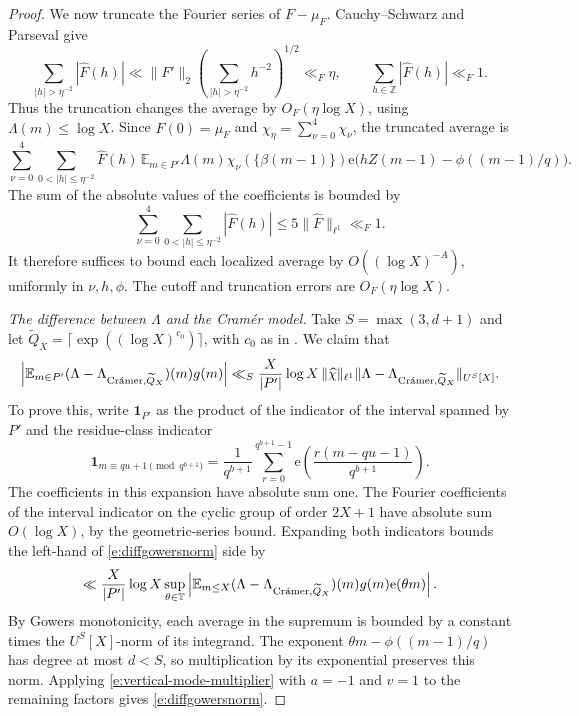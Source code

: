 \documentclass[12pt]{amsart}
\newcommand{\1}{\mathbf 1}
\newcommand{\e}{\mathrm e}
\newcommand{\Cramer}{\textup{Cr\'amer}}
\theoremstyle{definition}
\begin{document}
\begin{proof}
We now truncate the Fourier series of \(F-\mu_F\).
Cauchy--Schwarz and Parseval give
\[
 \sum_{|h|>\eta^{-2}}|\widehat F(h)|
 \ll \|F'\|_2
       \left(\sum_{|h|>\eta^{-2}}h^{-2}\right)^{1/2}
 \ll_F\eta,
 \qquad
 \sum_{h\in\mathbb Z}|\widehat F(h)|\ll_F1.
\]
Thus the truncation changes the average by \(O_F(\eta\log X)\),
using \(\Lambda(m)\leq\log X\). Since \(\widehat F(0)=\mu_F\) and
\(\chi_\eta=\sum_{\nu=0}^4\chi_\nu\), the truncated average is
\[
 \sum_{\nu=0}^4\sum_{0<|h|\leq\eta^{-2}}\widehat F(h)\,
 \mathbb E_{m\in P'}\Lambda(m)\chi_\nu(\{\beta(m-1)\})
 \e\bigl(hZ(m-1)-\phi((m-1)/q)\bigr).
\]
The sum of the absolute values of the coefficients is bounded by
\[
 \sum_{\nu=0}^4\sum_{0<|h|\leq\eta^{-2}}|\widehat F(h)|
 \leq 5\|\widehat F\|_{\ell^1}\ll_F 1.
\]
It therefore suffices to bound each localized average by
\(O((\log X)^{-A})\), uniformly in \(\nu,h,\phi\). The cutoff
and truncation errors are \(O_F(\eta\log X)\).

\medskip
\noindent\emph{The difference between \(\Lambda\) and the Cram\'er model.}
Take \(S=\max(3,d+1)\) and let
\(\widetilde Q_X=\lceil\exp((\log X)^{c_0})\rceil\), with \(c_0\)
as in \cite[Definition~2.3]{KMTT}. We claim that
\begin{align}\label{e:diffgowersnorm}
     \left|\mathbb E_{m\in P'}
   (\Lambda-\Lambda_{\Cramer,\widetilde Q_X})(m)g(m)\right|
 \ll_S
 \frac{X}{|P'|}\log X\,\|\widehat\chi\|_{\ell^1}
 \|\Lambda-\Lambda_{\Cramer,\widetilde Q_X}\|_{U^S[X]}.
\end{align}
To prove this, write \(\mathbf1_{P'}\) as the product of the
indicator of the interval spanned by \(P'\) and the residue-class
indicator
\[
 \mathbf1_{m\equiv qu+1\!\!\!\pmod{q^{b+1}}}
 =\frac1{q^{b+1}}\sum_{r=0}^{q^{b+1}-1}
   \e\!\left(\frac{r(m-qu-1)}{q^{b+1}}\right).
\]
The coefficients in this expansion have absolute sum one. The
Fourier coefficients of the interval indicator on the cyclic
group of order \(2X+1\) have absolute sum \(O(\log X)\), by the
geometric-series bound. Expanding both indicators  bounds
the left-hand of \eqref{e:diffgowersnorm} side by
\[
 \ll \frac{X}{|P'|}\log X
 \sup_{\theta\in\mathbb T}
 \left|\mathbb E_{m\leq X}
   (\Lambda-\Lambda_{\Cramer,\widetilde Q_X})(m)
   g(m)\e(\theta m)\right|.
\]
By Gowers monotonicity, each average in the supremum is bounded
by a constant times the \(U^S[X]\)-norm of its integrand.
The exponent \(\theta m-\phi((m-1)/q)\) has degree at most \(d<S\),
so multiplication by its exponential preserves this norm.
Applying \eqref{e:vertical-mode-multiplier} with \(a=-1\) and
\(v=1\) to the remaining factors gives \eqref{e:diffgowersnorm}.


\end{proof}
\end{document}
